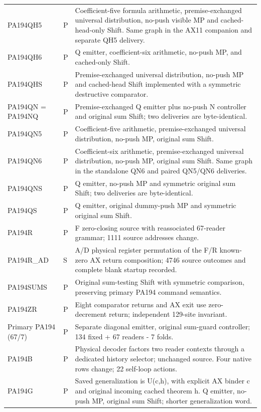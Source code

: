 \begin{longtable}{p{.22\linewidth}p{.06\linewidth}p{.63\linewidth}}
PA194QH5 & P & Coefficient-five formula arithmetic, premise-exchanged universal distribution, no-push visible MP and cached-head-only Shift. Same graph in the AX11 companion and separate QH5 delivery.\\
PA194QH6 & P & Q emitter, coefficient-six arithmetic, no-push MP, and cached-only Shift.\\
PA194QHS & P & Premise-exchanged universal distribution, no-push MP and cached-head Shift implemented with a symmetric destructive comparator.\\
PA194QN = PA194NQ & P & Premise-exchanged Q emitter plus no-push N controller and original sum Shift; two deliveries are byte-identical.\\
PA194QN5 & P & Coefficient-five arithmetic, premise-exchanged universal distribution, no-push MP, original sum Shift.\\
PA194QN6 & P & Coefficient-six arithmetic, premise-exchanged universal distribution, no-push MP, original sum Shift. Same graph in the standalone QN6 and paired QN5/QN6 deliveries.\\
PA194QNS & P & Q emitter, no-push MP and symmetric original sum Shift; two deliveries are byte-identical.\\
PA194QS & P & Q emitter, original dummy-push MP and symmetric original sum Shift.\\
PA194R & P & F zero-closing source with reassociated 67-reader grammar; 1111 source addresses change.\\
PA194R\_AD & S & A/D physical register permutation of the F/R known-zero AX return composition; 4746 source outcomes and complete blank startup recorded.\\
PA194SUMS & P & Original sum-testing Shift with symmetric comparison, preserving primary PA194 command semantics.\\
PA194ZR & P & Eight comparator returns and AX exit use zero-decrement return; independent 129-site invariant.\\
Primary PA194 (67/7) & P & Separate diagonal emitter, original sum-guard controller; 134 fixed + 67 readers - 7 folds.\\
PA194B & P & Physical decoder factors two reader contexts through a dedicated history selector; unchanged source. Four native rows change; 22 self-loop actions.\\
PA194G & P & Saved generalization is U(c,h), with explicit AX binder c and original incoming cached theorem h. Q emitter, no-push MP, original sum Shift; shorter generalization word.\\

\end{longtable}
